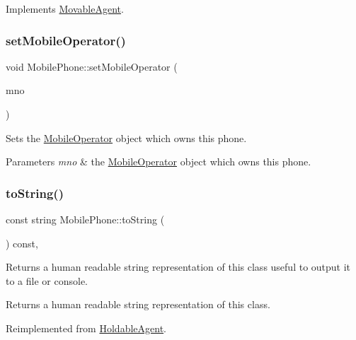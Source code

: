 Implements \mbox{\hyperlink{class_movable_agent_a88b617f0e78c817634e5b587da045ab0}{Movable\+Agent}}.

\mbox{\label{class_mobile_phone_ad4db8203e8f2e974733357d7c3e6cf28}} 
\subsubsection{\texorpdfstring{setMobileOperator()}{setMobileOperator()}}
{\footnotesize\ttfamily void Mobile\+Phone\+::set\+Mobile\+Operator (\begin{DoxyParamCaption}\item[{\mbox{\hyperlink{class_mobile_operator}{Mobile\+Operator}} $\ast$}]{mno }\end{DoxyParamCaption})}

Sets the \mbox{\hyperlink{class_mobile_operator}{Mobile\+Operator}} object which owns this phone. 
\begin{DoxyParams}{Parameters}
{\em mno} & the \mbox{\hyperlink{class_mobile_operator}{Mobile\+Operator}} object which owns this phone. \\
\hline
\end{DoxyParams}
\mbox{\label{class_mobile_phone_a2b7e556d12a43e380786ad0eccf3ce04}} 
\subsubsection{\texorpdfstring{toString()}{toString()}}
{\footnotesize\ttfamily const string Mobile\+Phone\+::to\+String (\begin{DoxyParamCaption}{ }\end{DoxyParamCaption}) const\hspace{0.3cm}{\ttfamily [override]}, {\ttfamily [virtual]}}

Returns a human readable string representation of this class useful to output it to a file or console. \begin{DoxyReturn}{Returns}
a human readable string representation of this class. 
\end{DoxyReturn}


Reimplemented from \mbox{\hyperlink{class_holdable_agent_a2c581226b8994f24b6b2306ae17dbb52}{Holdable\+Agent}}.

